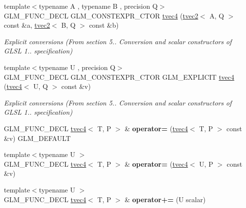 \begin{DoxyCompactItemize}
{\footnotesize template$<$typename A , typename B , precision Q$>$ }\\G\+L\+M\+\_\+\+F\+U\+N\+C\+\_\+\+D\+E\+CL G\+L\+M\+\_\+\+C\+O\+N\+S\+T\+E\+X\+P\+R\+\_\+\+C\+T\+OR \hyperlink{structglm_1_1tvec4_ab8d5ba79004e6e4d9ca3ee4f06c3d065}{tvec4} (\hyperlink{structglm_1_1tvec2}{tvec2}$<$ A, Q $>$ const \&a, \hyperlink{structglm_1_1tvec2}{tvec2}$<$ B, Q $>$ const \&b)
\begin{DoxyCompactList}\small\item\em Explicit conversions (From section 5.. Conversion and scalar constructors of G\+L\+SL 1.. specification) \end{DoxyCompactList}\item 
\mbox{\label{structglm_1_1tvec4_a2330120079eff2ab383c246d178c1682}} 
{\footnotesize template$<$typename U , precision Q$>$ }\\G\+L\+M\+\_\+\+F\+U\+N\+C\+\_\+\+D\+E\+CL G\+L\+M\+\_\+\+C\+O\+N\+S\+T\+E\+X\+P\+R\+\_\+\+C\+T\+OR G\+L\+M\+\_\+\+E\+X\+P\+L\+I\+C\+IT \hyperlink{structglm_1_1tvec4_a2330120079eff2ab383c246d178c1682}{tvec4} (\hyperlink{structglm_1_1tvec4}{tvec4}$<$ U, Q $>$ const \&v)
\begin{DoxyCompactList}\small\item\em Explicit conversions (From section 5.. Conversion and scalar constructors of G\+L\+SL 1.. specification) \end{DoxyCompactList}\item 
\mbox{\label{structglm_1_1tvec4_a0997bf645d42c36ec509712b8d3b9e56}} 
G\+L\+M\+\_\+\+F\+U\+N\+C\+\_\+\+D\+E\+CL \hyperlink{structglm_1_1tvec4}{tvec4}$<$ T, P $>$ \& {\bfseries operator=} (\hyperlink{structglm_1_1tvec4}{tvec4}$<$ T, P $>$ const \&v) G\+L\+M\+\_\+\+D\+E\+F\+A\+U\+LT
\item 
\mbox{\label{structglm_1_1tvec4_ac0decc5432f220ec3026a99866ee356d}} 
{\footnotesize template$<$typename U $>$ }\\G\+L\+M\+\_\+\+F\+U\+N\+C\+\_\+\+D\+E\+CL \hyperlink{structglm_1_1tvec4}{tvec4}$<$ T, P $>$ \& {\bfseries operator=} (\hyperlink{structglm_1_1tvec4}{tvec4}$<$ U, P $>$ const \&v)
\item 
\mbox{\label{structglm_1_1tvec4_a68b20faded17ea18abdd3f3210df9d72}} 
{\footnotesize template$<$typename U $>$ }\\G\+L\+M\+\_\+\+F\+U\+N\+C\+\_\+\+D\+E\+CL \hyperlink{structglm_1_1tvec4}{tvec4}$<$ T, P $>$ \& {\bfseries operator+=} (U scalar)

\end{DoxyCompactItemize}
